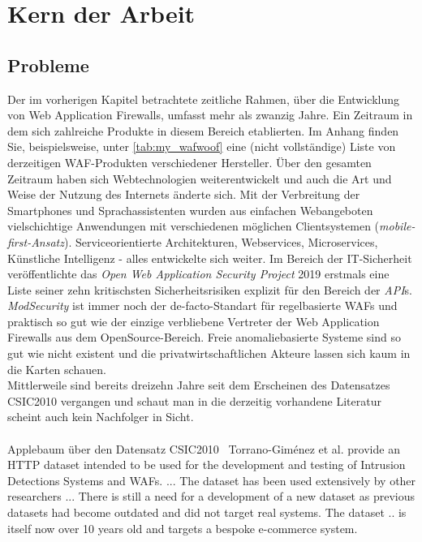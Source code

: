 \chapter{Kern der Arbeit}


\section{Probleme}
\label{sec:Probleme}

Der im vorherigen Kapitel betrachtete zeitliche Rahmen, über die Entwicklung von Web Application Firewalls, umfasst mehr als zwanzig Jahre. Ein Zeitraum in dem sich zahlreiche Produkte in diesem Bereich etablierten. Im Anhang finden Sie, beispielsweise, unter \ref{tab:my_wafwoof} eine (nicht vollständige) Liste von derzeitigen WAF-Produkten verschiedener Hersteller. Über den gesamten Zeitraum haben sich Webtechnologien weiterentwickelt und auch die Art und Weise der Nutzung des Internets änderte sich. Mit der Verbreitung der Smartphones und Sprachassistenten wurden aus einfachen Webangeboten vielschichtige Anwendungen mit verschiedenen möglichen Clientsystemen (\emph{mobile-first-Ansatz}). Serviceorientierte Architekturen, Webservices, Microservices, Künstliche Intelligenz - alles entwickelte sich weiter. Im Bereich der IT-Sicherheit veröffentlichte das \emph{Open Web Application Security Project} 2019 erstmals eine Liste seiner zehn kritischsten Sicherheitsrisiken explizit für den Bereich der \emph{API}s. \emph{ModSecurity} ist immer noch der de-facto-Standart für regelbasierte WAFs und praktisch so gut wie der einzige verbliebene Vertreter der Web Application Firewalls aus dem OpenSource-Bereich. Freie anomaliebasierte Systeme sind so gut wie nicht existent und die privatwirtschaftlichen Akteure lassen sich kaum in die Karten schauen. \\
Mittlerweile sind bereits dreizehn Jahre seit dem Erscheinen des Datensatzes CSIC2010 vergangen und schaut man in die derzeitig vorhandene Literatur scheint auch kein Nachfolger in Sicht. \\\\

\textcolor{bhtGray}{ Applebaum über den Datensatz CSIC2010~\cite{Applebaum2021}} Torrano-Giménez et al. provide an HTTP dataset intended to be used for the development and testing of Intrusion Detections Systems and WAFs. ... The dataset has been used extensively by other researchers ... There is still a need for a development of a new dataset as previous datasets had become outdated and did not target real systems. The dataset .. is itself now over 10 years old and targets a bespoke e-commerce system. \\\\

